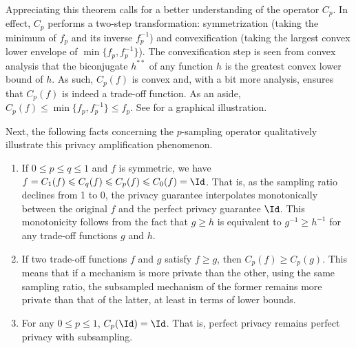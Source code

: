 Appreciating this theorem calls for a better understanding of the operator $C_p$. In effect, $C_p$ performs a two-step transformation: symmetrization (taking the minimum of $f_p$ and its inverse $f_p^{-1}$) and convexification (taking the largest convex lower envelope of $\min\{f_p, f_p^{-1}\}$). The convexification step is seen from convex analysis that the biconjugate $h^{**}$ of any function $h$ is the greatest convex lower bound of $h$. As such, $C_p(f)$ is convex and, with a bit more analysis,  ensures that $C_p(f)$ is indeed a trade-off function. As an aside, $C_p(f) \le \min\{f_p, f_p^{-1}\} \le f_p$. See  for a graphical illustration.




Next, the following facts concerning the $p$-sampling operator qualitatively illustrate this privacy amplification phenomenon.
\begin{enumerate}
\item If $0\leqslant p\leqslant q\leqslant 1$ and $f$ is symmetric, we have $f=C_1(f)\leqslant C_q(f)\leqslant C_p(f)\leqslant C_0(f)= \Id$. That is, as the sampling ratio declines from 1 to 0, the privacy guarantee interpolates monotonically between the original $f$ and the perfect privacy guarantee $\Id$. This monotonicity follows from the fact that $g \ge h$ is equivalent to $g^{-1} \ge h^{-1}$ for any trade-off functions $g$ and $h$.

\item
If two trade-off functions $f$ and $g$ satisfy $f \ge g$, then $C_p(f) \ge C_p(g)$. This means that if a mechanism is more private than the other, using the same sampling ratio, the subsampled mechanism of the former remains more private than that of the latter, at least in terms of lower bounds.

\item For any $0 \le p \le 1$, $C_p(\Id) = \Id$. That is, perfect privacy remains perfect privacy with subsampling.
\end{enumerate}

